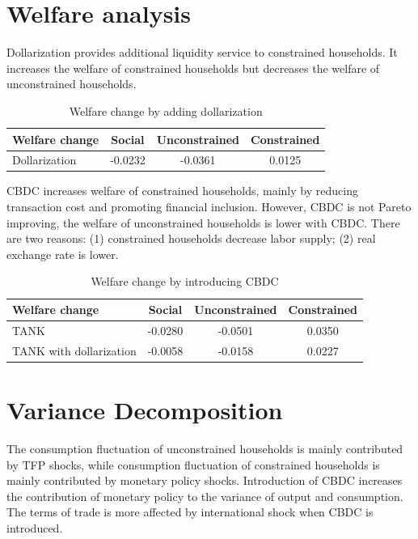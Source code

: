 \documentclass[12pt]{article}
\begin{document}
\clearpage

\section{Welfare analysis}
Dollarization provides additional liquidity service to constrained households. It increases the welfare of constrained households but decreases the welfare of unconstrained households. 
\begin{table}[h!]
\centering
\begin{tabular}{lccc}
\hline\hline
Welfare change & Social  & Unconstrained & Constrained  \\\hline
Dollarization &  -0.0232 &  -0.0361  &  0.0125 \\\hline        
\end{tabular}
\caption{Welfare change by adding dollarization}
\end{table}

CBDC increases welfare of constrained households, mainly by reducing transaction cost and promoting financial inclusion. However, CBDC is not Pareto improving, the welfare of unconstrained households is lower with CBDC. There are two reasons: (1) constrained households decrease labor supply; (2) real exchange rate is lower. 

\begin{table}[h!]
\centering
\begin{tabular}{lccc}
\hline\hline
Welfare change & Social & Unconstrained & Constrained  \\ \hline
TANK &   -0.0280  & -0.0501  &  0.0350 \\
TANK with dollarization &  -0.0058 &  -0.0158   & 0.0227 \\\hline
\end{tabular}
\caption{Welfare change by introducing CBDC}
\end{table}


\clearpage
\section{Variance Decomposition}
The consumption fluctuation of unconstrained households is mainly contributed by TFP shocks, while consumption fluctuation of constrained households is mainly contributed by monetary policy shocks. Introduction of CBDC increases the contribution of monetary policy to the variance of output and consumption. The terms of trade is more affected by international shock when CBDC is introduced. 
\end{document}
